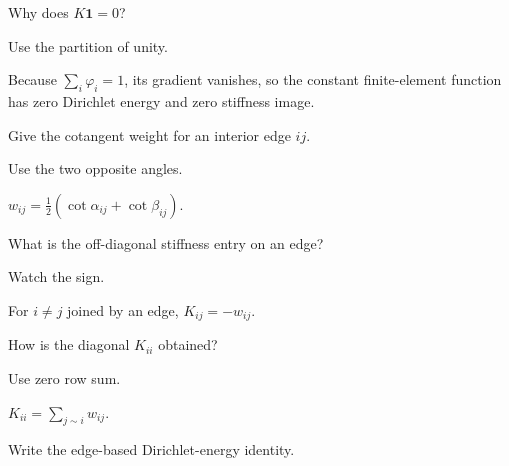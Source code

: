 \begin{exercise}\label{exr:vii41-06}
Why does \(K\mathbf1=0\)?
\end{exercise}

\begin{hint}
Use the partition of unity.
\end{hint}

\begin{solution}
Because \(\sum_i\varphi_i=1\), its gradient vanishes, so the constant finite-element function has zero Dirichlet energy and zero stiffness image.
\end{solution}

\begin{exercise}\label{exr:vii41-07}
Give the cotangent weight for an interior edge \(ij\).
\end{exercise}

\begin{hint}
Use the two opposite angles.
\end{hint}

\begin{solution}
\(w_{ij}=\tfrac12(\cot\alpha_{ij}+\cot\beta_{ij})\).
\end{solution}

\begin{exercise}\label{exr:vii41-08}
What is the off-diagonal stiffness entry on an edge?
\end{exercise}

\begin{hint}
Watch the sign.
\end{hint}

\begin{solution}
For \(i\ne j\) joined by an edge, \(K_{ij}=-w_{ij}\).
\end{solution}

\begin{exercise}\label{exr:vii41-09}
How is the diagonal \(K_{ii}\) obtained?
\end{exercise}

\begin{hint}
Use zero row sum.
\end{hint}

\begin{solution}
\(K_{ii}=\sum_{j\sim i}w_{ij}\).
\end{solution}

\begin{exercise}\label{exr:vii41-10}
Write the edge-based Dirichlet-energy identity.
\end{exercise}

